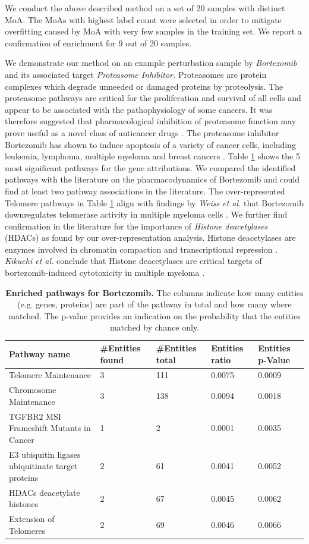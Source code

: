 \documentclass[bsc,frontabs,twoside,singlespacing,parskip,deptreport]{infthesis}     %
\begin{document}
We conduct the above described method on a set of 20 samples with distinct MoA. The MoAs with highest label count were selected in order to mitigate overfitting caused by MoA with very few samples in the training set. We report a confirmation of enrichment for 9 out of 20 samples. 


We demonstrate our method on an example perturbation sample by \textit{Bortezomib} and its associated target \textit{Proteasome Inhibitor.} Proteasomes are protein complexes which degrade unneeded or damaged proteins by proteolysis. The proteasome pathways are critical for the proliferation and survival of all cells and appear to be associated with the pathophysiology of some cancers. It was therefore suggested that pharmacological inhibition of proteasome function may prove useful as a novel class of anticancer drugs \cite{chen_bortezomib_2011}. The proteasome inhibitor Bortezomib has shown to induce apoptosis of a variety of cancer cells, including leukemia, lymphoma, multiple myeloma and breast cancers \cite{cao_ubiquitin-proteasomal_2011}.
Table \ref{bortezomib} shows the 5 most significant pathways for the gene attributions. We compared the identified pathways with the literature on the pharmacodynamics of Bortezomib and could find at least two pathway associations in the literature. 
The over-represented Telomere pathways in Table \ref{bortezomib} align with findings by \textit{Weiss et al.} that Bortezomib downregulates telomerase activity in multiple myeloma cells \cite{weiss_differential_2012}.
We further find confirmation in the literature for the importance of \textit{Histone deacetylases} (HDACs) as found by our over-representation analysis. Histone deacetylases are enzymes involved in chromatin compaction and transcriptional repression \cite{yang_rpd3hda1_2008}. \textit{Kikuchi et al.} conclude that Histone deacetylases are critical targets of bortezomib-induced cytotoxicity in multiple myeloma \cite{kikuchi_histone_2010}.\\
\begin{table}[h!]
\centering
\begin{tabular}{p{8cm}p{1.5cm}p{1.5cm}p{1.5cm}p{1.5cm}}
\toprule
Pathway name &	\#Entities found &	\#Entities total &	Entities ratio &	Entities p-Value\\
\midrule
Telomere Maintenance&	3&	111&	0.0075	&0.0009 \\
Chromosome Maintenance&	3&	138 &	0.0094&	0.0018 \\
TGFBR2 MSI Frameshift Mutants in Cancer &	1 &	2&	0.0001&	0.0035 \\
E3 ubiquitin ligases ubiquitinate target proteins&	2&	61&	0.0041&	0.0052\\
HDACs deacetylate histones&	2&	67&	0.0045&	0.0062\\
Extension of Telomeres&	2&	69&	0.0046&	0.0066 \\
\bottomrule
\end{tabular}
\caption{\textbf{Enriched pathways for Bortezomib.}  The columns indicate how many entities (e.g. genes, proteins) are part of the pathway in total and how many where matched. The p-value provides an indication on the probability that the entities matched by chance only.}\label{bortezomib}
\end{table}
\end{document}
